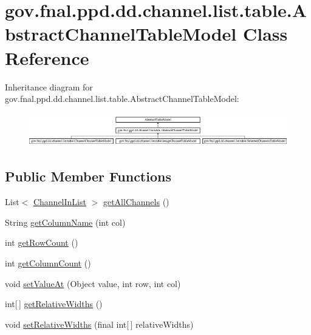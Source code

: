 \hypertarget{classgov_1_1fnal_1_1ppd_1_1dd_1_1channel_1_1list_1_1table_1_1AbstractChannelTableModel}{\section{gov.\-fnal.\-ppd.\-dd.\-channel.\-list.\-table.\-Abstract\-Channel\-Table\-Model Class Reference}
\label{classgov_1_1fnal_1_1ppd_1_1dd_1_1channel_1_1list_1_1table_1_1AbstractChannelTableModel}
}
Inheritance diagram for gov.\-fnal.\-ppd.\-dd.\-channel.\-list.\-table.\-Abstract\-Channel\-Table\-Model\-:\begin{figure}[H]
\begin{center}
\leavevmode
\includegraphics[height=1.473684cm]{classgov_1_1fnal_1_1ppd_1_1dd_1_1channel_1_1list_1_1table_1_1AbstractChannelTableModel}
\end{center}
\end{figure}
\subsection*{Public Member Functions}
\begin{DoxyCompactItemize}
\item 
List$<$ \hyperlink{interfacegov_1_1fnal_1_1ppd_1_1dd_1_1channel_1_1ChannelInList}{Channel\-In\-List} $>$ \hyperlink{classgov_1_1fnal_1_1ppd_1_1dd_1_1channel_1_1list_1_1table_1_1AbstractChannelTableModel_afdb38b8ef580a39a0cc6020bad6de956}{get\-All\-Channels} ()
\item 
String \hyperlink{classgov_1_1fnal_1_1ppd_1_1dd_1_1channel_1_1list_1_1table_1_1AbstractChannelTableModel_a1ba318cf0852ccb29b988156cb42e606}{get\-Column\-Name} (int col)
\item 
int \hyperlink{classgov_1_1fnal_1_1ppd_1_1dd_1_1channel_1_1list_1_1table_1_1AbstractChannelTableModel_a837bfac700eac04a2f0fad3f4f4d4607}{get\-Row\-Count} ()
\item 
int \hyperlink{classgov_1_1fnal_1_1ppd_1_1dd_1_1channel_1_1list_1_1table_1_1AbstractChannelTableModel_a86dc8c67bd825e26da6cc2c153711c0c}{get\-Column\-Count} ()
\item 
void \hyperlink{classgov_1_1fnal_1_1ppd_1_1dd_1_1channel_1_1list_1_1table_1_1AbstractChannelTableModel_a09b82ae4fdd621b017e38e692e53bf18}{set\-Value\-At} (Object value, int row, int col)
\item 
int\mbox{[}$\,$\mbox{]} \hyperlink{classgov_1_1fnal_1_1ppd_1_1dd_1_1channel_1_1list_1_1table_1_1AbstractChannelTableModel_a0ad344539266c20b6f1bbe88410e9079}{get\-Relative\-Widths} ()
\item 
void \hyperlink{classgov_1_1fnal_1_1ppd_1_1dd_1_1channel_1_1list_1_1table_1_1AbstractChannelTableModel_a54c6bf88f44803aec7e97c6ff71825e3}{set\-Relative\-Widths} (final int\mbox{[}$\,$\mbox{]} relative\-Widths)
\end{DoxyCompactItemize}
